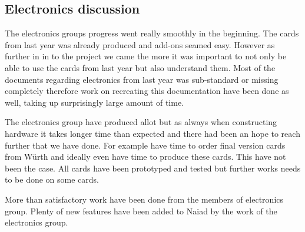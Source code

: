\subsection{Electronics discussion}
The electronics groups progress went really smoothly in the beginning. The cards from last year was already produced and add-ons seamed easy. However as further in in to the project we came the more it was important to not only be able to use the cards from last year but also understand them. Most of the documents regarding electronics from last year was sub-standard or missing completely therefore work on recreating this documentation have been done as well, taking up surprisingly large amount of time.

The electronics group have produced allot but as always when constructing hardware it takes longer time than expected and there had been an hope to reach further that we have done. For example have time to order final version cards from Würth and ideally even have time to produce these cards. This have not been the case. All cards have been prototyped and tested but further works needs to be done on some cards. 

More than satisfactory work have been done from the members of electronics group. Plenty of new features have been added to Naiad by the work of the electronics group. 